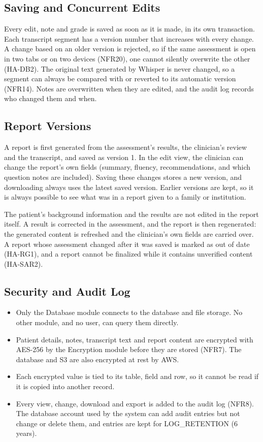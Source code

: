 \documentclass[12pt, titlepage]{article}
\begin{document}
\subsection{Saving and Concurrent Edits}

Every edit, note and grade is saved as soon as it is made, in its own transaction. Each transcript segment has a version number that increases with every change. A change based on an older version is rejected, so if the same assessment is open in two tabs or on two devices (NFR20), one cannot silently overwrite the other (HA-DB2). The original text generated by Whisper is never changed, so a segment can always be compared with or reverted to its automatic version (NFR14). Notes are overwritten when they are edited, and the audit log records who changed them and when.

\subsection{Report Versions}

A report is first generated from the assessment's results, the clinician's review and the transcript, and saved as version 1. In the edit view, the clinician can change the report's own fields (summary, fluency, recommendations, and which question notes are included). Saving these changes stores a new version, and downloading always uses the latest saved version. Earlier versions are kept, so it is always possible to see what was in a report given to a family or institution.

The patient's background information and the results are not edited in the report itself. A result is corrected in the assessment, and the report is then regenerated: the generated content is refreshed and the clinician's own fields are carried over. A report whose assessment changed after it was saved is marked as out of date (HA-RG1), and a report cannot be finalized while it contains unverified content (HA-SAR2).

\subsection{Security and Audit Log}
\begin{itemize}
\item Only the Database module connects to the database and file storage. No other module, and no user, can query them directly.
\item Patient details, notes, transcript text and report content are encrypted with AES-256 by the Encryption module before they are stored (NFR7). The database and S3 are also encrypted at rest by AWS.
\item Each encrypted value is tied to its table, field and row, so it cannot be read if it is copied into another record.
\item Every view, change, download and export is added to the audit log (NFR8). The database account used by the system can add audit entries but not change or delete them, and entries are kept for LOG\_RETENTION (6 years).
\end{itemize}
\end{document}
